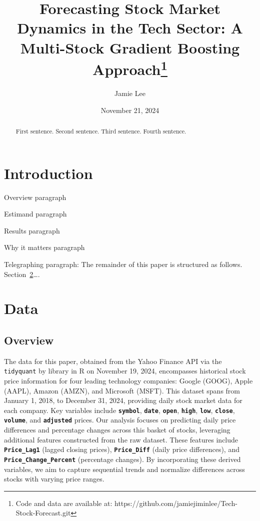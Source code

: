 \documentclass[
  letterpaper,
  DIV=11,
  numbers=noendperiod]{scrartcl}
\title{Forecasting Stock Market Dynamics in the Tech Sector: A
Multi-Stock Gradient Boosting Approach\thanks{Code and data are
available at: https://github.com/jamiejiminlee/Tech-Stock-Forecast.git}}
\author{Jamie Lee}
\date{November 21, 2024}
\begin{document}
\maketitle
\begin{abstract}
First sentence. Second sentence. Third sentence. Fourth sentence.
\end{abstract}


\section{Introduction}\label{introduction}

Overview paragraph

Estimand paragraph

Results paragraph

Why it matters paragraph

Telegraphing paragraph: The remainder of this paper is structured as
follows. Section~\ref{sec-data}\ldots.

\section{Data}\label{sec-data}

\subsection{Overview}\label{overview}

The data for this paper, obtained from the Yahoo Finance API via the
\texttt{tidyquant} by library in R on November 19, 2024, encompasses
historical stock price information for four leading technology
companies: Google (GOOG), Apple (AAPL), Amazon (AMZN), and Microsoft
(MSFT). This dataset spans from January 1, 2018, to December 31, 2024,
providing daily stock market data for each company. Key variables
include \textbf{\texttt{symbol}}, \textbf{\texttt{date}},
\textbf{\texttt{open}}, \textbf{\texttt{high}}, \textbf{\texttt{low}},
\textbf{\texttt{close}}, \textbf{\texttt{volume}}, and
\textbf{\texttt{adjusted}} prices. Our analysis focuses on predicting
daily price differences and percentage changes across this basket of
stocks, leveraging additional features constructed from the raw dataset.
These features include \textbf{\texttt{Price\_Lag1}} (lagged closing
prices), \textbf{\texttt{Price\_Diff}} (daily price differences), and
\textbf{\texttt{Price\_Change\_Percent}} (percentage changes). By
incorporating these derived variables, we aim to capture sequential
trends and normalize differences across stocks with varying price
ranges.
\end{document}
